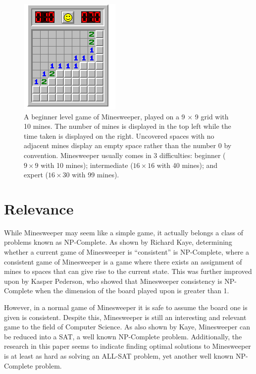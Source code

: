\documentclass[letterpaper]{article}
\begin{document}
\begin{figure}[t]
\centering
\includegraphics[width=0.5\columnwidth]{beginner}
\caption{A beginner level game of Minesweeper, played on a 9 $\times$ 9 grid with 10 mines.  The number of mines is displayed in the top left while the time taken is displayed on the right.  Uncovered spaces with no adjacent mines display an empty space rather than the number 0 by convention.  Minesweeper usually comes in 3 difficulties: beginner ($9 \times 9$ with 10 mines); intermediate ($16 \times 16$ with 40 mines); and expert ($16 \times 30$ with 99 mines).}
\label{fig:beginner_level}
\end{figure}

\section{Relevance}
While Minesweeper may seem like a simple game, it actually belongs a class of problems known as NP-Complete.  As shown by Richard Kaye, determining whether a current game of Minesweeper is ``consistent'' is NP-Complete, where a consistent game of Minesweeper is a game where there exists an assignment of mines to spaces that can give rise to the current state.  This was further improved upon by Kasper Pederson, who showed that Minesweeper consistency is NP-Complete when the dimension of the board played upon is greater than 1.

However, in a normal game of Minesweeper it is safe to assume the board one is given is consistent.  Despite this, Minesweeper is still an interesting and relevant game to the field of Computer Science.  As also shown by Kaye, Minesweeper can be reduced into a SAT, a well known NP-Complete problem.  Additionally, the research in this paper seems to indicate finding optimal solutions to Minesweeper is at least as hard as solving an ALL-SAT problem, yet another well known NP-Complete problem.
\end{document}
